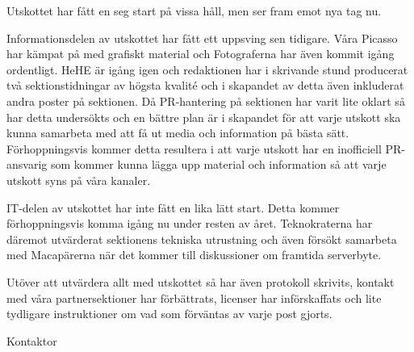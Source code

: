 \documentclass[../_main/handlingar.tex]{subfiles}
\begin{document}

Utskottet har fått en seg start på vissa håll, men ser fram emot nya tag nu. 

Informationsdelen av utskottet har fått ett uppsving sen tidigare. Våra Picasso har kämpat på med grafiskt material och Fotograferna har även kommit igång ordentligt. HeHE är igång igen och redaktionen har i skrivande stund producerat två sektionstidningar av högsta kvalité och i skapandet av detta även inkluderat andra poster på sektionen. 
Då PR-hantering på sektionen har varit lite oklart så har detta undersökts och en bättre plan är i skapandet för att varje utskott ska kunna samarbeta med att få ut media och information på bästa sätt. Förhoppningsvis kommer detta resultera i att varje utskott har en inofficiell PR-ansvarig som kommer kunna lägga upp material och information så att varje utskott syns på våra kanaler. 

IT-delen av utskottet har inte fått en lika lätt start. Detta kommer förhoppningsvis komma igång nu under resten av året. Teknokraterna har däremot utvärderat sektionens tekniska utrustning och även försökt samarbeta med Macapärerna när det kommer till diskussioner om framtida serverbyte. 

Utöver att utvärdera allt med utskottet så har även protokoll skrivits, kontakt med våra partnersektioner har förbättrats, licenser har införskaffats och lite tydligare instruktioner om vad som förväntas av varje post gjorts.


\begin{signatures}{1}
    \mvh
    \signature{\sekr}{Kontaktor}
\end{signatures}
\end{document}
